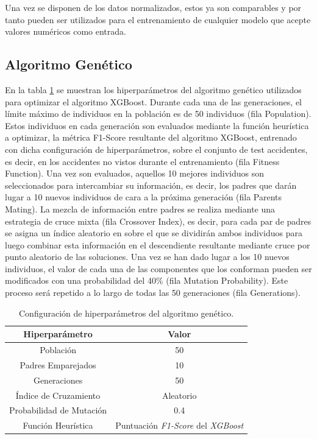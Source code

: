 \documentclass{uathesis-es}
\begin{document}
{Una vez se disponen de los datos normalizados, estos ya son comparables y por tanto pueden ser utilizados para el entrenamiento de cualquier modelo que acepte valores numéricos como entrada.


\subsection{Algoritmo Genético}


En la tabla \ref{GAHyperparametersSetup} se muestran los hiperparámetros del algoritmo genético utilizados para optimizar el algoritmo XGBoost. Durante cada una de las generaciones, el límite máximo de individuos en la población es de 50 individuos (fila Population). Estos individuos en cada generación son evaluados mediante la función heurística a optimizar, la métrica F1-Score resultante del algoritmo XGBoost, entrenado con dicha configuración de hiperparámetros, sobre el conjunto de test accidentes, es decir, en los accidentes no vistos durante el entrenamiento (fila Fitness Function). Una vez son evaluados, aquellos 10 mejores individuos son seleccionados para intercambiar su información, es decir, los padres que darán lugar a 10 nuevos individuos de cara a la próxima generación (fila Parents Mating). La mezcla de información entre padres se realiza mediante una estrategia de cruce mixta (fila Crossover Index), es decir, para cada par de padres se asigna un índice aleatorio en sobre el que se dividirán ambos individuos para luego combinar esta información en el descendiente resultante mediante cruce por punto aleatorio de las soluciones. Una vez se han dado lugar a los 10 nuevos individuos, el valor de cada una de las componentes que los conforman pueden ser modificados con una probabilidad del 40\% (fila Mutation Probability). Este proceso será repetido a lo largo de todas las 50 generaciones (fila Generations).


\begin{table}[H]
    \centering
    \begin{tabular}{|c|c|}
        \hline
            \textbf{Hiperparámetro} & \textbf{Valor} \\ \hline
            \hline
            Población     & 50 \\ \hline
            Padres Emparejados & 10 \\ \hline
            Generaciones    & 50 \\ \hline
            Índice de Cruzamiento & Aleatorio \\ \hline
            Probabilidad de Mutación & 0.4 \\ \hline
            Función Heurística & Puntuación \textit{F1-Score} del \textit{XGBoost} \\ \hline \hline
    \end{tabular}
    \caption{Configuración de hiperparámetros del algoritmo genético.}
	\label{GAHyperparametersSetup}
\end{table}

}
\end{document}
